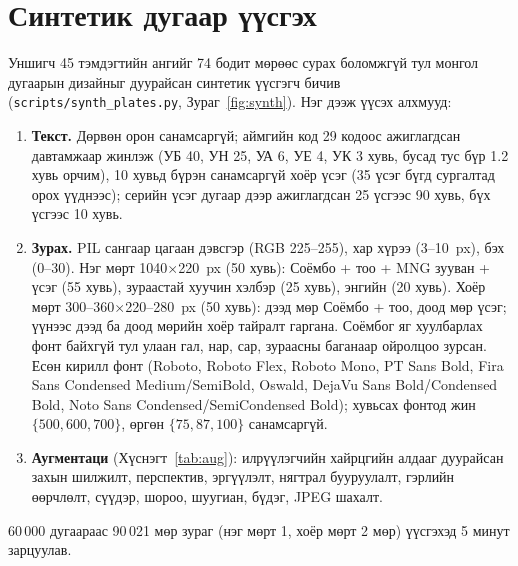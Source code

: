 \section{Синтетик дугаар үүсгэх}
Уншигч 45 тэмдэгтийн ангийг 74 бодит мөрөөс сурах боломжгүй тул монгол дугаарын дизайныг дуурайсан синтетик үүсгэгч бичив (\texttt{scripts/synth\_plates.py}, Зураг~\ref{fig:synth}). Нэг дээж үүсэх алхмууд:
\begin{enumerate}[leftmargin=2.5em]
\item \textbf{Текст.} Дөрвөн орон санамсаргүй; аймгийн код 29 кодоос ажиглагдсан давтамжаар жинлэж (УБ 40, УН 25, УА 6, УЕ 4, УК 3 хувь, бусад тус бүр 1.2 хувь орчим), 10 хувьд бүрэн санамсаргүй хоёр үсэг (35 үсэг бүгд сургалтад орох үүднээс); серийн үсэг дугаар дээр ажиглагдсан 25 үсгээс 90 хувь, бүх үсгээс 10 хувь.
\item \textbf{Зурах.} PIL сангаар цагаан дэвсгэр (RGB 225--255), хар хүрээ (3--10~px), бэх (0--30). Нэг мөрт 1040$\times$220~px (50 хувь): Соёмбо + тоо + MNG зууван + үсэг (55 хувь), зураастай хуучин хэлбэр (25 хувь), энгийн (20 хувь). Хоёр мөрт 300--360$\times$220--280~px (50 хувь): дээд мөр Соёмбо + тоо, доод мөр үсэг; үүнээс дээд ба доод мөрийн хоёр тайралт гаргана. Соёмбог яг хуулбарлах фонт байхгүй тул улаан гал, нар, сар, зураасны баганаар ойролцоо зурсан. Есөн кирилл фонт (Roboto, Roboto Flex, Roboto Mono, PT Sans Bold, Fira Sans Condensed Medium/SemiBold, Oswald, DejaVu Sans Bold/Condensed Bold, Noto Sans Condensed/SemiCondensed Bold); хувьсах фонтод жин $\{500,600,700\}$, өргөн $\{75,87,100\}$ санамсаргүй.
\item \textbf{Аугментаци} (Хүснэгт~\ref{tab:aug}): илрүүлэгчийн хайрцгийн алдааг дуурайсан захын шилжилт, перспектив, эргүүлэлт, нягтрал бууруулалт, гэрлийн өөрчлөлт, сүүдэр, шороо, шуугиан, бүдэг, JPEG шахалт.
\end{enumerate}
60\,000 дугаараас 90\,021 мөр зураг (нэг мөрт 1, хоёр мөрт 2 мөр) үүсгэхэд 5 минут зарцуулав.
